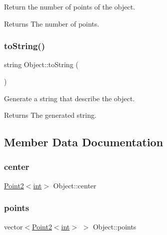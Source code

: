 Return the number of points of the object. 

\begin{DoxyReturn}{Returns}
The number of points. 
\end{DoxyReturn}
\mbox{\label{class_object_acf6d17366700fe12cafd6269561fad69}} 
\subsubsection{\texorpdfstring{toString()}{toString()}}
{\footnotesize\ttfamily string Object\+::to\+String (\begin{DoxyParamCaption}{ }\end{DoxyParamCaption})}



Generate a string that describe the object. 

\begin{DoxyReturn}{Returns}
The generated string. 
\end{DoxyReturn}


\subsection{Member Data Documentation}
\mbox{\label{class_object_a73b61b5048f06c8d79d1cbab64d953a0}} 
\subsubsection{\texorpdfstring{center}{center}}
{\footnotesize\ttfamily \mbox{\hyperlink{class_point2}{Point2}}$<$\mbox{\hyperlink{draw_8hh_aa620a13339ac3a1177c86edc549fda9b}{int}}$>$ Object\+::center\hspace{0.3cm}{\ttfamily [protected]}}

\mbox{\label{class_object_aeb711bf0b9c9e157b436a177bd2a80e9}} 
\subsubsection{\texorpdfstring{points}{points}}
{\footnotesize\ttfamily vector$<$\mbox{\hyperlink{class_point2}{Point2}}$<$\mbox{\hyperlink{draw_8hh_aa620a13339ac3a1177c86edc549fda9b}{int}}$>$ $>$ Object\+::points\hspace{0.3cm}{\ttfamily [protected]}}

